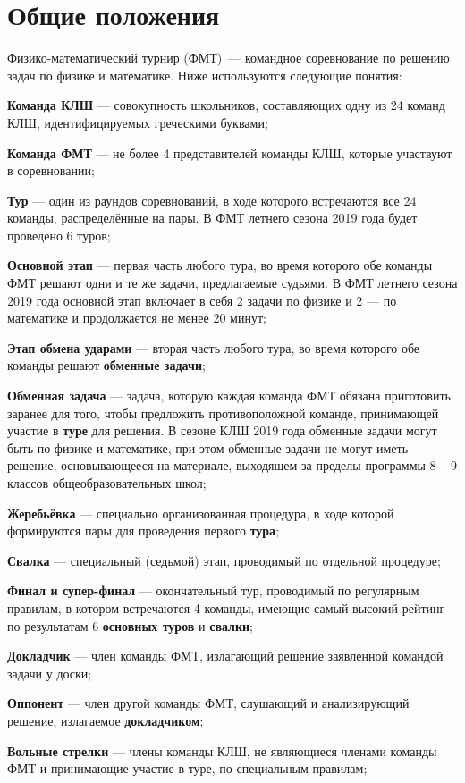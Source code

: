 \documentclass[12pt,a4paper]{article}
\begin{document}
\section{Общие положения}
Физико-математический турнир (ФМТ)~--- командное соревнование по решению задач по физике и математике. Ниже используются следующие понятия:
\begin{list}{.}{\leftmargin=10mm  \topsep=0mm  \itemsep=1pt \parsep=0mm \itemindent=-15pt}
\item \textbf{Команда КЛШ} --- совокупность школьников, составляющих одну из 24 команд КЛШ, идентифицируемых греческими буквами;
\item \textbf{Команда ФМТ} --- не более 4 представителей команды КЛШ, которые участвуют в соревновании;
\item \textbf{Тур} --- один из раундов соревнований, в ходе которого встречаются все 24 команды, распределённые на пары. В ФМТ летнего сезона 2019 года будет проведено 6 туров;
\item \textbf{Основной этап} --- первая часть любого тура, во время которого обе команды ФМТ решают одни и те же задачи, предлагаемые судьями. В ФМТ летнего сезона 2019 года основной этап включает в себя 2 задачи по физике и 2 --- по математике и продолжается не менее 20 минут;
\item \textbf{Этап обмена ударами} --- вторая часть любого тура, во время которого обе команды решают \textbf{обменные задачи};
\item \textbf{Обменная задача} --- задача, которую каждая команда ФМТ обязана приготовить заранее для того, чтобы предложить противоположной команде, принимающей участие в \textbf{туре} для решения. В сезоне КЛШ 2019 года обменные задачи могут быть по физике и математике, при этом обменные задачи не могут иметь решение, основывающееся на материале, выходящем за пределы программы 8 -- 9 классов общеобразовательных школ;
\item \textbf{Жеребьёвка} --- специально организованная процедура, в ходе которой формируются пары для проведения первого \textbf{тура};
\item \textbf{Свалка} --- специальный (седьмой) этап, проводимый по отдельной процедуре;
\item \textbf{Финал и супер-финал} --- окончательный тур, проводимый по регулярным правилам, в котором встречаются 4 команды, имеющие самый высокий рейтинг по результатам 6 \textbf{основных туров} и \textbf{свалки};
\item \textbf{Докладчик} --- член команды ФМТ, излагающий решение заявленной командой задачи у доски;
\item \textbf{Оппонент} --- член другой команды ФМТ, слушающий и анализирующий решение, излагаемое \textbf{докладчиком};
\item \textbf{Вольные стрелки} --- члены команды КЛШ, не являющиеся членами команды ФМТ и принимающие участие в туре, по специальным правилам;
\end{list}
\end{document}
